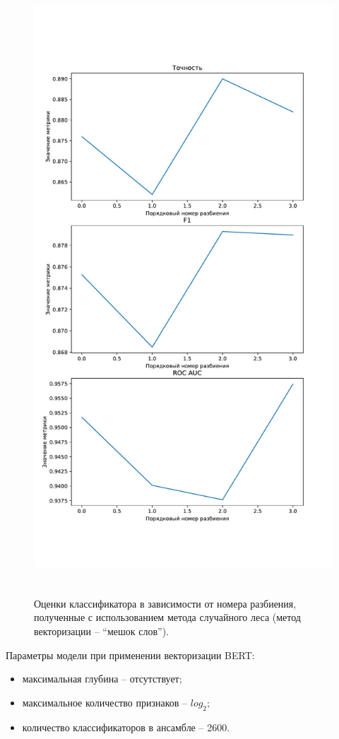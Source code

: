 \begin{figure}[H]
	\centering
	\includegraphics[height=23cm]{inc/plots/randomMetricsBag.pdf}
	\caption{ Оценки классификатора в зависимости от номера разбиения, полученные с использованием метода случайного леса (метод векторизации --  ``мешок слов''). }
	\label{img:randomMetricsBag}
\end{figure}


Параметры модели при применении векторизации BERT:
\begin{itemize}
	\item максимальная глубина -- отсутствует;
	\item максимальное количество признаков -- $log_2$;
	\item количество классификаторов в ансамбле -- 2600.
\end{itemize}

